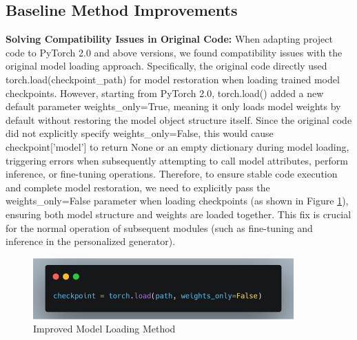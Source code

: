 \documentclass[10pt,a4paper]{article}
\begin{document}
\subsection{Baseline Method Improvements}
\textbf{Solving Compatibility Issues in Original Code:}
When adapting project code to PyTorch 2.0 and above versions, we found compatibility issues with the original model loading approach. Specifically, the original code directly used torch.load(checkpoint\_path) for model restoration when loading trained model checkpoints. However, starting from PyTorch 2.0, torch.load() added a new default parameter weights\_only=True, meaning it only loads model weights by default without restoring the model object structure itself. Since the original code did not explicitly specify weights\_only=False, this would cause checkpoint['model'] to return None or an empty dictionary during model loading, triggering errors when subsequently attempting to call model attributes, perform inference, or fine-tuning operations. Therefore, to ensure stable code execution and complete model restoration, we need to explicitly pass the weights\_only=False parameter when loading checkpoints (as shown in Figure \ref{fig:model_loader}), ensuring both model structure and weights are loaded together. This fix is crucial for the normal operation of subsequent modules (such as fine-tuning and inference in the personalized generator).

\begin{figure}[H]
  \centering
  \includegraphics[width=10cm]{fig/load_new.png}
  \caption{Improved Model Loading Method}\label{fig:model_loader}
\end{figure}
\end{document}
